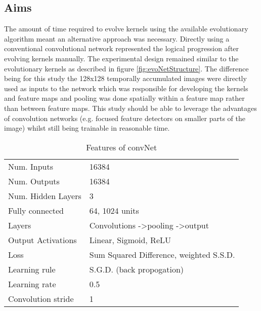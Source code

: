\subsection{Aims}
The amount of time required to evolve kernels using the available evolutionary algorithm meant an alternative approach was necessary. 
Directly using a conventional convolutional network represented the logical progression after evolving kernels manually. 
The experimental design remained similar to the evolutionary kernels as described in figure \ref{fig:evoNetStructure}.
The difference being for this study the 128x128 temporally accumulated images were directly used as inputs to the network which was responsible for developing the kernels and feature maps and pooling was done spatially within a feature map rather than between feature maps.
This study should be able to leverage the advantages of convolution networks (e.g. focused feature detectors on smaller parts of the image) whilst still being trainable in reasonable time. 

\begin{table}[h]
\centering
\begin{tabular}{ | l | l | }
    \hline
    Num. Inputs & 16384 \\
    Num. Outputs & 16384 \\
    Num. Hidden Layers & 3 \\
    Fully connected & 64, 1024 units \\
    Layers & Convolutions -\textgreater pooling -\textgreater output \\
    Output Activations & Linear, Sigmoid, ReLU \\
    Loss & Sum Squared Difference, weighted S.S.D. \\
    Learning rule & S.G.D. (back propogation) \\
    Learning rate & 0.5 \\
    Convolution stride & 1 \\
    \hline
\end{tabular}
\caption{Features of convNet}
\label{tb:convNetdef}
\end{table}


